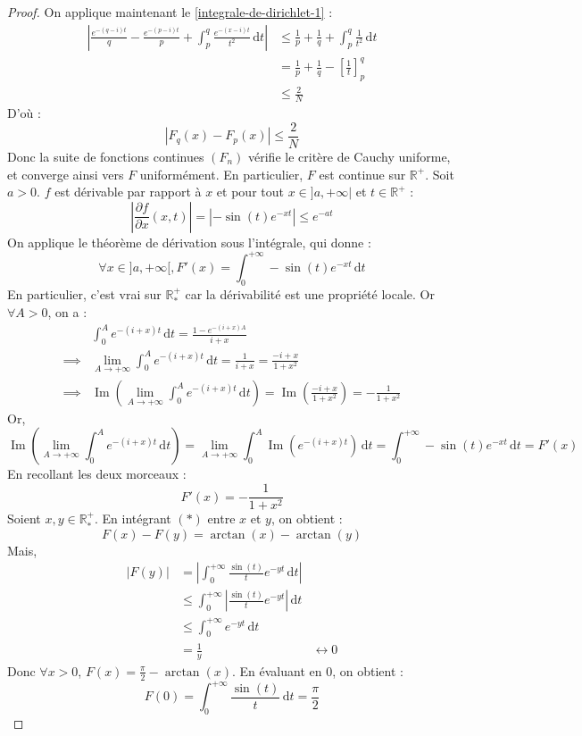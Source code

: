 \begin{proof}
		On applique maintenant le \cref{integrale-de-dirichlet-1} :
		\begin{align*}
			\left| \frac{e^{-(q-i)t}}{q} - \frac{e^{-(p-i)t}}{p} +  \int_p^q \frac{e^{-(x-i)t}}{t^2} \, \mathrm{d}t \right| &\leq \frac{1}{p} + \frac{1}{q} + \int_p^q \frac{1}{t^2} \, \mathrm{d}t \\
			&= \frac{1}{p} + \frac{1}{q} - \left[ \frac{1}{t} \right]^q_p \\
			&\leq \frac{2}{N}
		\end{align*}
		D'où :
		\[ |F_q(x) - F_p(x)| \leq \frac{2}{N} \]
		Donc la suite de fonctions continues $(F_n)$ vérifie le critère de Cauchy uniforme, et converge ainsi vers $F$ uniformément. En particulier, $F$ est continue sur $\mathbb{R}^+$.
		\newpar
		Soit $a > 0$. $f$ est dérivable par rapport à $x$ et pour tout $x \in ]a, +\infty|$ et $t \in \mathbb{R}^+$ :
		\[ \left| \frac{\partial f}{\partial x} (x, t) \right| = |-\sin(t) e^{-xt}| \leq e^{-at} \]
		On applique le théorème de dérivation sous l'intégrale, qui donne :
		\[ \forall x \in ]a, +\infty[, F'(x) = \int_0^{+\infty} -\sin(t) e^{-xt} \, \mathrm{d}t \]
		En particulier, c'est vrai sur $\mathbb{R}^+_*$ car la dérivabilité est une propriété locale. Or $\forall A > 0$, on a :
		\begin{align*}
			& \int_0^A e^{-(i+x)t} \, \mathrm{d}t = \frac{1-e^{-(i+x)A}}{i+x} \\
			\implies & \lim_{A \rightarrow +\infty} \int_0^A e^{-(i+x)t} \, \mathrm{d}t = \frac{1}{i+x} = \frac{-i+x}{1 + x^2} \\
			\implies & \operatorname{Im} \left( \lim_{A \rightarrow +\infty} \int_0^A e^{-(i+x)t} \, \mathrm{d}t \right) = \operatorname{Im} \left( \frac{-i+x}{1 + x^2} \right) = -\frac{1}{1 + x^2}
		\end{align*}
		Or,
		\[ \operatorname{Im} \left( \lim_{A \rightarrow +\infty} \int_0^A e^{-(i+x)t} \, \mathrm{d}t \right) = \lim_{A \rightarrow +\infty} \int_0^A \operatorname{Im} \left( e^{-(i+x)t} \right) \, \mathrm{d}t = \int_0^{+\infty} -\sin(t) e^{-xt} \, \mathrm{d}t = F'(x) \]
		En recollant les deux morceaux :
		\[ F'(x) = -\frac{1}{1+x^2} \tag{$*$} \]
		Soient $x, y \in \mathbb{R}^+_*$. En intégrant $(*)$ entre $x$ et $y$, on obtient :
		\[ F(x) - F(y) = \arctan(x) - \arctan(y) \]
		Mais,
		\begin{align*}
			|F(y)| &= \left| \int_0^{+\infty} \frac{\sin(t)}{t} e^{-yt} \, \mathrm{d}t \right| \\
			&\leq \int_0^{+\infty} \left| \frac{\sin(t)}{t} e^{-yt} \right| \, \mathrm{d}t \\
			&\leq \int_0^{+\infty} e^{-yt} \, \mathrm{d}t \\
			&= \frac{1}{y}
			&\longleftrightarrow 0
		\end{align*}
		Donc $\forall x > 0$, $F(x) = \frac{\pi}{2} - \arctan(x)$. En évaluant en $0$, on obtient :
		\[ F(0) = \int_0^{+\infty} \frac{\sin(t)}{t} \, \mathrm{d}t = \frac{\pi}{2} \]
	\end{proof}

